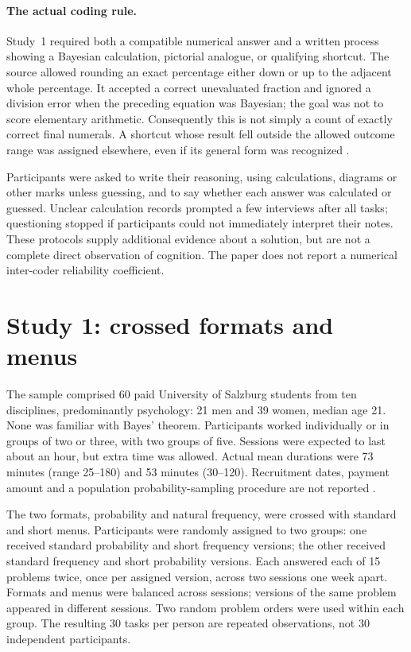 \paragraph{The actual coding rule.}
Study~1 required both a compatible numerical answer and a written process
showing a Bayesian calculation, pictorial analogue, or qualifying shortcut.
The source allowed rounding an exact percentage either down or up to the
adjacent whole percentage. It accepted a correct unevaluated fraction and
ignored a division error when the preceding equation was Bayesian; the goal
was not to score elementary arithmetic. Consequently this is not simply a
count of exactly correct final numerals. A shortcut whose result fell outside
the allowed outcome range was assigned elsewhere, even if its general form
was recognized \cite[p.~692]{GigerenzerHoffrage1995FrequencyFormats}.

Participants were asked to write their reasoning, using calculations,
diagrams or other marks unless guessing, and to say whether each answer was
calculated or guessed. Unclear calculation records prompted a few interviews
after all tasks; questioning stopped if participants could not immediately
interpret their notes. These protocols supply additional evidence about a
solution, but are not a complete direct observation of cognition. The paper
does not report a numerical inter-coder reliability coefficient.

\section{Study 1: crossed formats and menus}
\label{sec:p19-frequency-study-one}

The sample comprised 60 paid University of Salzburg students from ten
disciplines, predominantly psychology: 21 men and 39 women, median age 21.
None was familiar with Bayes' theorem. Participants worked individually or
in groups of two or three, with two groups of five. Sessions were expected
to last about an hour, but extra time was allowed. Actual mean durations
were 73 minutes (range 25--180) and 53 minutes (30--120).
Recruitment dates, payment amount and a population probability-sampling
procedure are not reported \cite[pp.~692--693]{GigerenzerHoffrage1995FrequencyFormats}.

The two formats, probability and natural frequency, were crossed with
standard and short menus. Participants were randomly assigned to two groups:
one received standard probability and short frequency versions; the other
received standard frequency and short probability versions. Each answered
each of 15 problems twice, once per assigned version, across two sessions
one week apart. Formats and menus were balanced across sessions; versions
of the same problem appeared in different sessions. Two random problem
orders were used within each group. The resulting 30 tasks per person are
repeated observations, not 30 independent participants.


